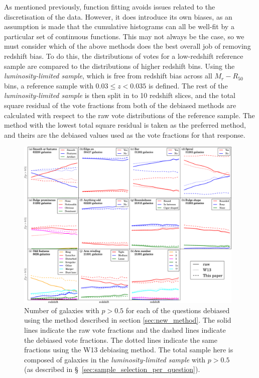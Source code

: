 \documentclass[useAMS,usenatbib]{mn2e}
\begin{document}
As mentioned previously, function fitting avoids issues related to the discretisation of the data. However, it does introduce its own biases, as an assumption is made that the cumulative histograms can all be well-fit by a particular set of continuous functions. This may not always be the case, so we must consider which of the above methods does the best overall job of removing redshift bias. To do this, the distributions of votes for a low-redshift reference sample are compared to the distributions of higher redshift bins. Using the \textit{luminosity-limited sample}, which is free from redshift bias across all $M_r - R_{50}$ bins, a reference sample with $0.03 \leq z < 0.035$ is defined. The rest of the \textit{luminosity-limited sample} is then split in to 10 redshift slices,  and the total square residual of the vote fractions from both of the debiased methods are calculated with respect to the raw vote distributions of the reference sample. The method with the lowest total square residual is taken as the preferred method, and theirs are the debiased values used as the vote fractions for that response.

\begin{figure}
		\centering

        \includegraphics[width=0.975\textwidth]{Images/Bias/Debiasing/all_thresholds.pdf}

        \caption{Number of galaxies with $p>0.5$ for each of the questions debiased using the method described in section \ref{sec:new_method}. The solid lines indicate the raw vote fractions and the dashed lines indicate the debiased vote fractions. The dotted lines indicate the same fractions using the W13 debiasing method. The total sample here is composed of galaxies in the \textit{luminosity-limited sample} with $p>0.5$ (as described in \S~\ref{sec:sample_selection_per_question}).}

        \label{fig:all_thresholds}

\end{figure}
\end{document}
